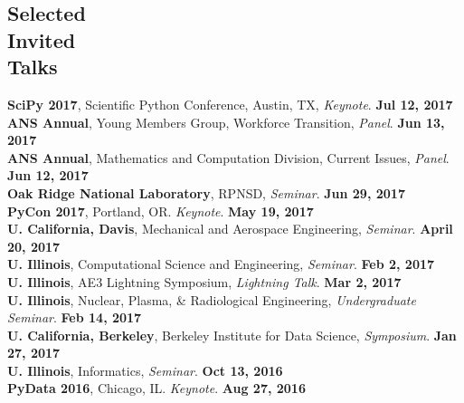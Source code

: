 \documentclass[margin,line]{resume}
\begin{document}
\begin{resume}
    \section{\mysidestyle Selected\\Invited\\Talks}
      \textbf{SciPy 2017}, Scientific Python Conference, Austin, TX, \emph{Keynote}.  \hfill\textbf{Jul 12, 2017}\\
      \textbf{ANS Annual}, Young Members Group, Workforce Transition, \emph{Panel}.  \hfill\textbf{Jun 13, 2017}\\
      \textbf{ANS Annual}, Mathematics and Computation Division, Current Issues, \emph{Panel}.  \hfill\textbf{Jun 12, 2017}\\
      \textbf{Oak Ridge National Laboratory}, RPNSD, \emph{Seminar}.  \hfill\textbf{Jun 29, 2017}\\
      \textbf{PyCon 2017}, Portland, OR. \emph{Keynote}.  \hfill\textbf{May 19, 2017}\\
      \textbf{U. California, Davis}, Mechanical and Aerospace Engineering, \emph{Seminar}.  \hfill\textbf{April 20, 2017}\\
      \textbf{U. Illinois}, Computational Science and Engineering, \emph{Seminar}.  \hfill\textbf{Feb 2, 2017}\\
      \textbf{U. Illinois}, AE3 Lightning Symposium, \emph{Lightning Talk}.  \hfill\textbf{Mar 2, 2017}\\
      \textbf{U. Illinois}, Nuclear, Plasma, \& Radiological Engineering, \emph{Undergraduate Seminar}.  \hfill\textbf{Feb 14, 2017}\\
      \textbf{U. California, Berkeley}, Berkeley Institute for Data Science, \emph{Symposium}.  \hfill\textbf{Jan 27, 2017}\\
      \textbf{U. Illinois}, Informatics, \emph{Seminar}.  \hfill\textbf{Oct 13, 2016}\\
      \textbf{PyData 2016}, Chicago, IL. \emph{Keynote}.  \hfill\textbf{Aug 27, 2016}

\end{resume}
\end{document}
